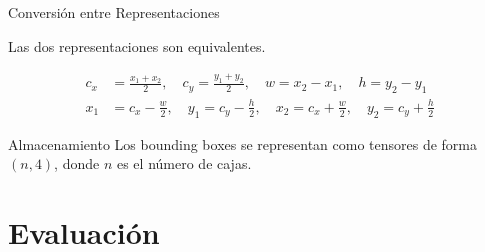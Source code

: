 \documentclass[aspectratio=169, 10pt]{beamer}
\begin{document}
\begin{frame}[shrink]{Conversi\'on entre Representaciones}

	Las dos representaciones son equivalentes.

	\vspace{0.4cm}

	{\small
	\begin{align*}
		c_x &= \frac{x_1 + x_2}{2}, \quad c_y = \frac{y_1 + y_2}{2}, \quad w = x_2 - x_1, \quad h = y_2 - y_1 \\[0.3cm]
		x_1 &= c_x - \frac{w}{2}, \quad y_1 = c_y - \frac{h}{2}, \quad x_2 = c_x + \frac{w}{2}, \quad y_2 = c_y + \frac{h}{2}
	\end{align*}
	}

	\vspace{0.3cm}

	\begin{block}{Almacenamiento}
		Los bounding boxes se representan como tensores de forma $(n, 4)$, donde $n$ es el n\'umero de cajas.
	\end{block}

\end{frame}

\section{Evaluaci\'on}
\end{document}
